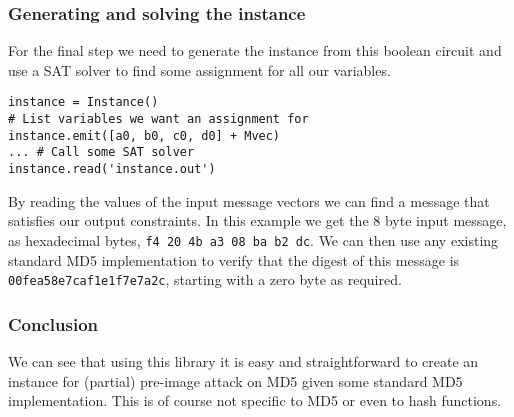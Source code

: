 \subsubsection{Generating and solving the instance}
For the final step we need to generate the instance from this boolean circuit and use a SAT solver to find some assignment for all our variables.

\begin{verbatim}
instance = Instance()
# List variables we want an assignment for
instance.emit([a0, b0, c0, d0] + Mvec) 
... # Call some SAT solver
instance.read('instance.out')
\end{verbatim}

By reading the values of the input message vectors we can find a message that satisfies our output constraints.
In this example we get the 8 byte input message, as hexadecimal bytes, \texttt{f4 20 4b a3 08 ba b2 dc}.
We can then use any existing standard MD5 implementation to verify that the digest of this message is \texttt{00\-fe\-a5\-8e\-7c\-af\-1e\-1f\-7e\-7a\-2c}, starting with a zero byte as required.

\subsubsection{Conclusion}
We can see that using this library it is easy and straightforward to create an instance for (partial) pre-image attack on MD5 given some standard MD5 implementation. 
This is of course not specific to MD5 or even to hash functions.


%
%
